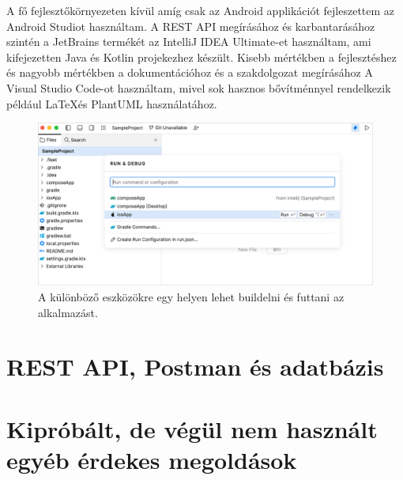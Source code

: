 A fő fejlesztőkörnyezeten kívül amíg csak az Android applikációt fejleszettem az Android Studiot használtam.
A REST API megírásához és karbantarásához szintén a JetBrains termékét az IntelliJ IDEA Ultimate-et használtam, ami kifejezetten Java és Kotlin projekezhez készült.
Kisebb mértékben a fejlesztéshez és nagyobb mértékben a dokumentációhoz és a szakdolgozat megírásához A Visual Studio Code-ot használtam, mivel sok hasznos bővítménnyel rendelkezik például \LaTeX és PlantUML használatához.


\begin{figure}[!ht]
    \centering
    \includegraphics[width=150mm, keepaspectratio]{figures/fleet-run-configurations.png}
    \caption{A különböző eszközökre egy helyen lehet buildelni és futtani az alkalmazást. \cite{Fleet}}
    \label{fig:RunConfigs}
\end{figure}




\section{REST API, Postman és adatbázis}


\section{Kipróbált, de végül nem használt egyéb érdekes megoldások}